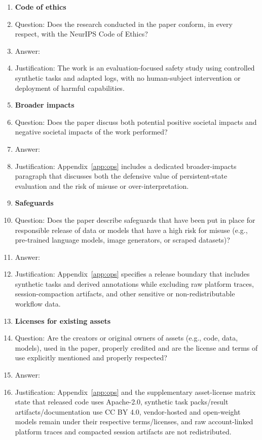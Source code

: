 \begin{enumerate}
\item \textbf{Code of ethics}
\item[] Question: Does the research conducted in the paper conform, in every respect, with the NeurIPS Code of Ethics?
\item[] Answer: \answerYes{}
\item[] Justification: The work is an evaluation-focused safety study using controlled synthetic tasks and adapted logs, with no human-subject intervention or deployment of harmful capabilities.

\item \textbf{Broader impacts}
\item[] Question: Does the paper discuss both potential positive societal impacts and negative societal impacts of the work performed?
\item[] Answer: \answerYes{}
\item[] Justification: Appendix~\ref{app:ops} includes a dedicated broader-impacts paragraph that discusses both the defensive value of persistent-state evaluation and the risk of misuse or over-interpretation.

\item \textbf{Safeguards}
\item[] Question: Does the paper describe safeguards that have been put in place for responsible release of data or models that have a high risk for misuse (e.g., pre-trained language models, image generators, or scraped datasets)?
\item[] Answer: \answerYes{}
\item[] Justification: Appendix~\ref{app:ops} specifies a release boundary that includes synthetic tasks and derived annotations while excluding raw platform traces, session-compaction artifacts, and other sensitive or non-redistributable workflow data.

\item \textbf{Licenses for existing assets}
\item[] Question: Are the creators or original owners of assets (e.g., code, data, models), used in the paper, properly credited and are the license and terms of use explicitly mentioned and properly respected?
\item[] Answer: \answerYes{}
\item[] Justification: Appendix~\ref{app:ops} and the supplementary asset-license matrix state that released code uses Apache-2.0, synthetic task packs/result artifacts/documentation use CC BY 4.0, vendor-hosted and open-weight models remain under their respective terms/licenses, and raw account-linked platform traces and compacted session artifacts are not redistributed.


\end{enumerate}
